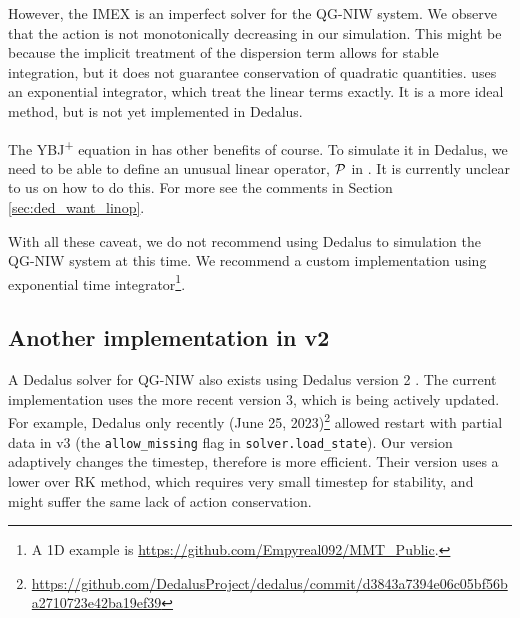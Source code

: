 However, the IMEX is an imperfect solver for the QG-NIW system. We observe that the action is not monotonically decreasing in our simulation. This might be because the implicit treatment of the dispersion term allows for stable integration, but it does not guarantee conservation of quadratic quantities. \cite{RochaEtAl_18} uses an exponential integrator, which treat the linear terms exactly. It is a more ideal method, but is not yet implemented in Dedalus.

The YBJ\textsuperscript{+} equation in \cite{AsselinYoung_19} has other benefits of course. To simulate it in Dedalus, we need to be able to define an unusual linear operator, $\mathcal{P}$ in \cite[(3.2)]{Xie_20}. It is currently unclear to us on how to do this. For more see the comments in Section  \ref{sec:ded_want_linop}.

With all these caveat, we do not recommend using Dedalus to simulation the QG-NIW system at this time. We recommend a custom implementation using exponential time integrator\footnote{A 1D example is \url{https://github.com/Empyreal092/MMT_Public}.}.

\subsection{Another implementation in v2}
A Dedalus solver for QG-NIW also exists using Dedalus version 2 \parencite{Conn_2023}. The current implementation uses the more recent version 3, which is being actively updated. For example, Dedalus only recently (June 25, 2023)\footnote{\url{https://github.com/DedalusProject/dedalus/commit/d3843a7394e06c05bf56ba2710723e42ba19ef39}\;} allowed restart with partial data in v3 (the \verb|allow_missing| flag in \verb|solver.load_state|). Our version adaptively changes the timestep, therefore is more efficient. Their version uses a lower over RK method, which requires very small timestep for stability, and might suffer the same lack of action conservation. 
